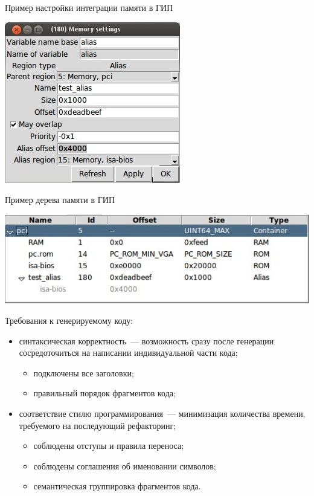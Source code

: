\documentclass[unicode,hyperref={unicode=true}]{beamer}
\theoremstyle{definition}
\theoremstyle{plain}
\begin{document}
\begin{frame}{Пример настройки интеграции памяти в ГИП}
\begin{center}
\includegraphics[height=0.7\textheight]{test_alias.jpg}
\end{center}
\end{frame}



\begin{frame}{Пример дерева памяти в ГИП}
\begin{center}
\includegraphics[width=\textwidth]{memory_tree.jpg}
\end{center}
\end{frame}



\begin{frame}{Требования к генерируемому коду:}
\begin{itemize}
\item синтаксическая корректность~--- возможность сразу после генерации
сосредоточиться на написании индивидуальной части кода;
\begin{itemize}
\item подключены все заголовки;
\item правильный порядок фрагментов кода;
\end{itemize}
\item соответствие стилю программирования~--- минимизация количества времени,
требуемого на последующий рефакторинг;
\begin{itemize}
\item соблюдены отступы и правила переноса;
\item соблюдены соглашения об именовании символов;
\item семантическая группировка фрагментов кода.
\end{itemize}
\end{itemize}
\end{frame}
\end{document}
